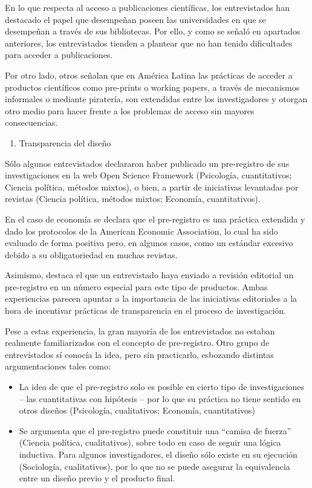 \documentclass[
  letterpaper,
  DIV=11,
  numbers=noendperiod]{scrreprt}
\providecommand{\tightlist}{%
  \setlength{\itemsep}{0pt}\setlength{\parskip}{0pt}}\usepackage{longtable,booktabs,array}
\begin{document}
En lo que respecta al acceso a publicaciones científicas, los
entrevistados han destacado el papel que desempeñan poseen las
universidades en que se desempeñan a través de sus bibliotecas. Por
ello, y como se señaló en apartados anteriores, los entrevistados
tienden a plantear que no han tenido dificultades para acceder a
publicaciones.

Por otro lado, otros señalan que en América Latina las prácticas de
acceder a productos científicos como pre-prints o working papers, a
través de mecanismos informales o mediante piratería, son extendidas
entre los investigadores y otorgan otro medio para hacer frente a los
problemas de acceso sin mayores consecuencias.

\begin{enumerate}
\def\labelenumi{\alph{enumi})}
\setcounter{enumi}{1}
\tightlist
\item
  Transparencia del diseño
\end{enumerate}

Sólo algunos entrevistados declararon haber publicado un pre-registro de
sus investigaciones en la web Open Science Framework (Psicología,
cuantitativos; Ciencia política, métodos mixtos), o bien, a partir de
iniciativas levantadas por revistas (Ciencia política, métodos mixtos;
Economía, cuantitativos).

En el caso de economía se declara que el pre-registro es una práctica
extendida y dado los protocolos de la American Economic Association, lo
cual ha sido evaluado de forma positiva pero, en algunos casos, como un
estándar excesivo debido a su obligatoriedad en muchas revistas.

Asimismo, destaca el que un entrevistado haya enviado a revisión
editorial un pre-registro en un número especial para este tipo de
productos. Ambas experiencias parecen apuntar a la importancia de las
iniciativas editoriales a la hora de incentivar prácticas de
transparencia en el proceso de investigación.

Pese a estas experiencia, la gran mayoría de los entrevistados no
estaban realmente familiarizados con el concepto de pre-registro. Otro
grupo de entrevistados sí conocía la idea, pero sin practicarlo,
esbozando distintas argumentaciones tales como:

\begin{itemize}
\item
  La idea de que el pre-registro solo es posible en cierto tipo de
  investigaciones -- las cuantitativas con hipótesis -- por lo que su
  práctica no tiene sentido en otros diseños (Psicología, cualitativos;
  Economía, cuantitativos)
\item
  Se argumenta que el pre-registro puede constituir una ``camisa de
  fuerza'' (Ciencia política, cualitativos), sobre todo en caso de
  seguir una lógica inductiva. Para algunos investigadores, el diseño
  sólo existe en su ejecución (Sociología, cualitativos), por lo que no
  se puede asegurar la equivalencia entre un diseño previo y el producto
  final.
\end{itemize}
\end{document}
